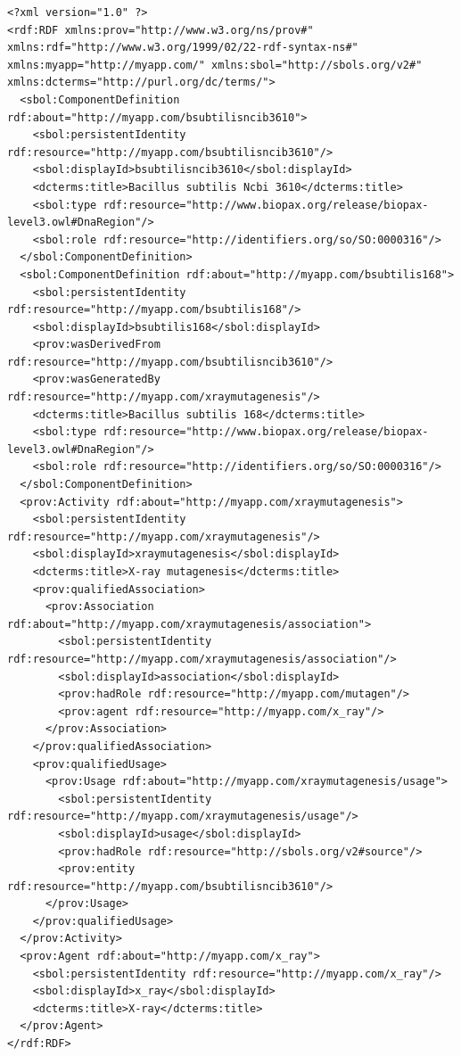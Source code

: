 \begin{lstlisting}
<?xml version="1.0" ?>
<rdf:RDF xmlns:prov="http://www.w3.org/ns/prov#" xmlns:rdf="http://www.w3.org/1999/02/22-rdf-syntax-ns#" xmlns:myapp="http://myapp.com/" xmlns:sbol="http://sbols.org/v2#" xmlns:dcterms="http://purl.org/dc/terms/">
  <sbol:ComponentDefinition rdf:about="http://myapp.com/bsubtilisncib3610">
    <sbol:persistentIdentity rdf:resource="http://myapp.com/bsubtilisncib3610"/>
    <sbol:displayId>bsubtilisncib3610</sbol:displayId>
    <dcterms:title>Bacillus subtilis Ncbi 3610</dcterms:title>
    <sbol:type rdf:resource="http://www.biopax.org/release/biopax-level3.owl#DnaRegion"/>
    <sbol:role rdf:resource="http://identifiers.org/so/SO:0000316"/>
  </sbol:ComponentDefinition>
  <sbol:ComponentDefinition rdf:about="http://myapp.com/bsubtilis168">
    <sbol:persistentIdentity rdf:resource="http://myapp.com/bsubtilis168"/>
    <sbol:displayId>bsubtilis168</sbol:displayId>
    <prov:wasDerivedFrom rdf:resource="http://myapp.com/bsubtilisncib3610"/>
    <prov:wasGeneratedBy rdf:resource="http://myapp.com/xraymutagenesis"/>
    <dcterms:title>Bacillus subtilis 168</dcterms:title>
    <sbol:type rdf:resource="http://www.biopax.org/release/biopax-level3.owl#DnaRegion"/>
    <sbol:role rdf:resource="http://identifiers.org/so/SO:0000316"/>
  </sbol:ComponentDefinition>
  <prov:Activity rdf:about="http://myapp.com/xraymutagenesis">
    <sbol:persistentIdentity rdf:resource="http://myapp.com/xraymutagenesis"/>
    <sbol:displayId>xraymutagenesis</sbol:displayId>
    <dcterms:title>X-ray mutagenesis</dcterms:title>
    <prov:qualifiedAssociation>
      <prov:Association rdf:about="http://myapp.com/xraymutagenesis/association">
        <sbol:persistentIdentity rdf:resource="http://myapp.com/xraymutagenesis/association"/>
        <sbol:displayId>association</sbol:displayId>
        <prov:hadRole rdf:resource="http://myapp.com/mutagen"/>
        <prov:agent rdf:resource="http://myapp.com/x_ray"/>
      </prov:Association>
    </prov:qualifiedAssociation>
    <prov:qualifiedUsage>
      <prov:Usage rdf:about="http://myapp.com/xraymutagenesis/usage">
        <sbol:persistentIdentity rdf:resource="http://myapp.com/xraymutagenesis/usage"/>
        <sbol:displayId>usage</sbol:displayId>
        <prov:hadRole rdf:resource="http://sbols.org/v2#source"/>
        <prov:entity rdf:resource="http://myapp.com/bsubtilisncib3610"/>
      </prov:Usage>
    </prov:qualifiedUsage>
  </prov:Activity>
  <prov:Agent rdf:about="http://myapp.com/x_ray">
    <sbol:persistentIdentity rdf:resource="http://myapp.com/x_ray"/>
    <sbol:displayId>x_ray</sbol:displayId>
    <dcterms:title>X-ray</dcterms:title>
  </prov:Agent>
</rdf:RDF>
\end{lstlisting}

